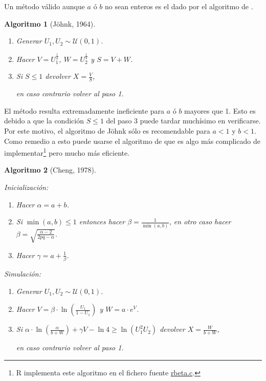 \documentclass[
  spanish,
  10pt,
]{book}
\theoremstyle{break}
\newtheorem{conjecture}{Algoritmo}[chapter]
\theoremstyle{nonumberplain}
\let\oldfootnote\footnote
\renewcommand\footnote[1]{\oldfootnote{\hspace{2mm}#1}}
\begin{document}
Un método válido aunque \(a\) ó \(b\) no sean enteros es el dado por el algoritmo de \citet{johnk1964}.

\begin{conjecture}[Jöhnk, 1964]
\protect\hypertarget{cnj:johnk}{}\label{cnj:johnk}

\begin{enumerate}
\def\labelenumi{\arabic{enumi}.}
\item
  Generar \(U_1, U_2\sim \mathcal{U}(0, 1)\).
\item
  Hacer \(V = U_1^{\frac1a}\), \(W = U_2^{\frac1b}\) y \(S = V+W\).
\item
  Si \(S \leq 1\) devolver \(X = \frac VS\),

  en caso contrario volver al paso 1.
\end{enumerate}

\end{conjecture}

El método resulta extremadamente ineficiente para \(a\) ó \(b\) mayores que 1.
Esto es debido a que la condición \(S\leq1\) del paso 3 puede tardar muchísimo en verificarse.
Por este motivo, el algoritmo de Jöhnk sólo es recomendable para \(a<1\) y \(b<1\).
Como remedio a esto puede usarse el algoritmo de \citet{cheng1978} que es algo más complicado de implementar\footnote{R implementa este algoritmo en el fichero fuente \href{https://svn.r-project.org/R/trunk/src/nmath/rbeta.c}{rbeta.c}.} pero mucho más eficiente.

\begin{conjecture}[Cheng, 1978]
\protect\hypertarget{cnj:cheng}{}\label{cnj:cheng}

Inicialización:

\begin{enumerate}
\def\labelenumi{\arabic{enumi}.}
\item
  Hacer \(\alpha = a + b\).
\item
  Si \(\min(a,b) \leq1\) entonces hacer \(\beta=\frac1{\min(  a,b)}\), en otro caso hacer \(\beta=\sqrt{\frac{\alpha-2}{2pq-\alpha}}\).
\item
  Hacer \(\gamma=a+\frac1\beta\).
\end{enumerate}

Simulación:

\begin{enumerate}
\def\labelenumi{\arabic{enumi}.}
\item
  Generar \(U_1, U_2\sim \mathcal{U}(0, 1)\).
\item
  Hacer \(V=\beta\cdot\ln\left(  \frac{U_1}{1-U_1}\right)\) y \(W=a\cdot e^{V}\).
\item
  Si \(\alpha\cdot\ln\left( \frac\alpha{b+W}\right) +\gamma V-\ln4 \ge \ln\left(  U_1^{2}U_2\right)\) devolver \(X=\frac W{b+W}\),

  en caso contrario volver al paso 1.
\end{enumerate}

\end{conjecture}
\end{document}
